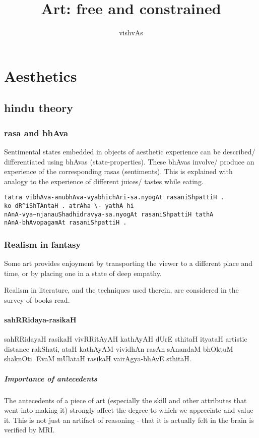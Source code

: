 \documentclass[oneside, article]{memoir}
\title{Art: free and constrained}
\author{vishvAs}
\begin{document}
\maketitle
\part{Aesthetics}
\chapter{hindu theory}
\section{rasa and bhAva}
Sentimental states embedded in objects of aesthetic experience can be described/ differentiated using bhAvas (state-properties). These bhAvas involve/ produce an experience of the corresponding rasas (sentiments). This is explained with analogy to the experience of different juices/ tastes while eating.

\begin{verbatim}
tatra vibhAva-anubhAva-vyabhichAri-sa.nyogAt rasaniShpattiH .
ko dR^iShTAntaH . atrAha \- yathA hi
nAnA-vya~njanauShadhidravya-sa.nyogAt rasaniShpattiH tathA
nAnA-bhAvopagamAt rasaniShpattiH .
\end{verbatim}


\section{Realism in fantasy}
Some art provides enjoyment by transporting the viewer to a different place and time, or by placing one in a state of deep empathy.

Realism in literature, and the techniques used therein, are considered in the survey of books read.

\subsection{sahRRidaya-rasikaH}
sahRRidayaH rasikaH vivRRitAyAH kathAyAH dUrE sthitaH ityataH artistic distance rakShati, ataH kathAyAM vividhAn rasAn sAnandaM bhOktuM shaknOti. EvaM mUlataH rasikaH vairAgya-bhAvE sthitaH.

\subsubsection{Importance of antecedents}
The antecedents of a piece of art (especially the skill and other attributes that went into making it) strongly affect the degree to which we appreciate and value it. This is not just an artifact of reasoning - that it is actually felt in the brain is verified by MRI.
\end{document}
